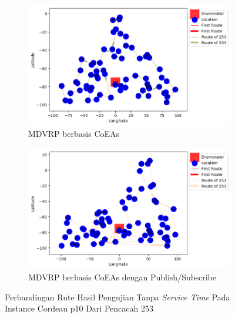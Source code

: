 \begin{figure}[H]
	\centering
	\begin{subfigure}[t]{\textwidth}
		\centering
		\includegraphics[width=\textwidth]{Resources/Images/cordeau_p10/cordeau_p10_notw_253_coes}
		\caption{MDVRP berbasis CoEAs}
		\label{fig:cordeau_p10_notw_253_coes}
	\end{subfigure}
	\begin{subfigure}[t]{\textwidth}
		\centering
		\includegraphics[width=\textwidth]{Resources/Images/cordeau_p10/cordeau_p10_notw_253_pubsub_coes}
		\caption{MDVRP berbasis CoEAs dengan Publish/Subscribe}
		\label{fig:cordeau_p10_notw_253_pubsub_coes}
	\end{subfigure}
	\caption{Perbandingan Rute Hasil Pengujian Tanpa \textit{Service Time} Pada Instance Cordeau p10 Dari Pencacah 253}
	\label{fig:cordeau_p10_notw_253}
\end{figure}